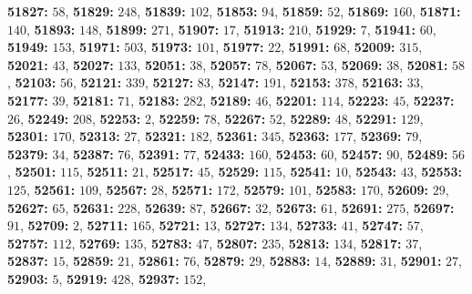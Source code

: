 \textsf{\bfseries 51827:} $58$, \textsf{\bfseries 51829:} $248$, \textsf{\bfseries 51839:} $102$, \textsf{\bfseries 51853:} $94$, \textsf{\bfseries 51859:} $52$, \textsf{\bfseries 51869:} $160$, \textsf{\bfseries 51871:} $140$, \textsf{\bfseries 51893:} $148$, \textsf{\bfseries 51899:} $271$, \textsf{\bfseries 51907:} $17$, \textsf{\bfseries 51913:} $210$, \textsf{\bfseries 51929:} $7$, \textsf{\bfseries 51941:} $60$, \textsf{\bfseries 51949:} $153$, \textsf{\bfseries 51971:} $503$, \textsf{\bfseries 51973:} $101$, \textsf{\bfseries 51977:} $22$, \textsf{\bfseries 51991:} $68$, \textsf{\bfseries 52009:} $315$, \textsf{\bfseries 52021:} $43$, \textsf{\bfseries 52027:} $133$, \textsf{\bfseries 52051:} $38$, \textsf{\bfseries 52057:} $78$, \textsf{\bfseries 52067:} $53$, \textsf{\bfseries 52069:} $38$, \textsf{\bfseries 52081:} $58$, \textsf{\bfseries 52103:} $56$, \textsf{\bfseries 52121:} $339$, \textsf{\bfseries 52127:} $83$, \textsf{\bfseries 52147:} $191$, \textsf{\bfseries 52153:} $378$, \textsf{\bfseries 52163:} $33$, \textsf{\bfseries 52177:} $39$, \textsf{\bfseries 52181:} $71$, \textsf{\bfseries 52183:} $282$, \textsf{\bfseries 52189:} $46$, \textsf{\bfseries 52201:} $114$, \textsf{\bfseries 52223:} $45$, \textsf{\bfseries 52237:} $26$, \textsf{\bfseries 52249:} $208$, \textsf{\bfseries 52253:} $2$, \textsf{\bfseries 52259:} $78$, \textsf{\bfseries 52267:} $52$, \textsf{\bfseries 52289:} $48$, \textsf{\bfseries 52291:} $129$, \textsf{\bfseries 52301:} $170$, \textsf{\bfseries 52313:} $27$, \textsf{\bfseries 52321:} $182$, \textsf{\bfseries 52361:} $345$, \textsf{\bfseries 52363:} $177$, \textsf{\bfseries 52369:} $79$, \textsf{\bfseries 52379:} $34$, \textsf{\bfseries 52387:} $76$, \textsf{\bfseries 52391:} $77$, \textsf{\bfseries 52433:} $160$, \textsf{\bfseries 52453:} $60$, \textsf{\bfseries 52457:} $90$, \textsf{\bfseries 52489:} $56$, \textsf{\bfseries 52501:} $115$, \textsf{\bfseries 52511:} $21$, \textsf{\bfseries 52517:} $45$, \textsf{\bfseries 52529:} $115$, \textsf{\bfseries 52541:} $10$, \textsf{\bfseries 52543:} $43$, \textsf{\bfseries 52553:} $125$, \textsf{\bfseries 52561:} $109$, \textsf{\bfseries 52567:} $28$, \textsf{\bfseries 52571:} $172$, \textsf{\bfseries 52579:} $101$, \textsf{\bfseries 52583:} $170$, \textsf{\bfseries 52609:} $29$, \textsf{\bfseries 52627:} $65$, \textsf{\bfseries 52631:} $228$, \textsf{\bfseries 52639:} $87$, \textsf{\bfseries 52667:} $32$, \textsf{\bfseries 52673:} $61$, \textsf{\bfseries 52691:} $275$, \textsf{\bfseries 52697:} $91$, \textsf{\bfseries 52709:} $2$, \textsf{\bfseries 52711:} $165$, \textsf{\bfseries 52721:} $13$, \textsf{\bfseries 52727:} $134$, \textsf{\bfseries 52733:} $41$, \textsf{\bfseries 52747:} $57$, \textsf{\bfseries 52757:} $112$, \textsf{\bfseries 52769:} $135$, \textsf{\bfseries 52783:} $47$, \textsf{\bfseries 52807:} $235$, \textsf{\bfseries 52813:} $134$, \textsf{\bfseries 52817:} $37$, \textsf{\bfseries 52837:} $15$, \textsf{\bfseries 52859:} $21$, \textsf{\bfseries 52861:} $76$, \textsf{\bfseries 52879:} $29$, \textsf{\bfseries 52883:} $14$, \textsf{\bfseries 52889:} $31$, \textsf{\bfseries 52901:} $27$, \textsf{\bfseries 52903:} $5$, \textsf{\bfseries 52919:} $428$, \textsf{\bfseries 52937:} $152$, 
